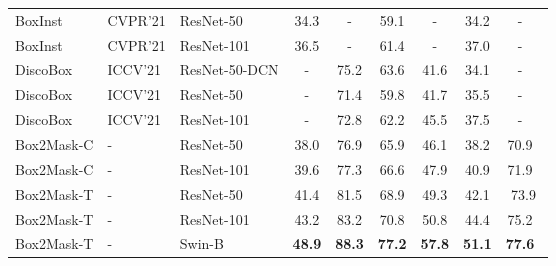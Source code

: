 \documentclass[12pt,onecolumn,letterpaper]{article}
\begin{document}
\begin{table*}[t]
{{\begin{tabular}{lllcccccc}
			
			BoxInst~\cite{cvpr2021_boxinst}  &CVPR'21 & ResNet-50 & 34.3 &- & 59.1 & -  & 34.2  & -~\\ 
			BoxInst~\cite{cvpr2021_boxinst}  &CVPR'21 & ResNet-101 & 36.5& - & 61.4 & - & 37.0 & -~ \\ 
			
			DiscoBox~\cite{iccv2021discobox} &ICCV'21  & ResNet-50-DCN &-& 75.2 &63.6 & 41.6& 34.1 &-~\\ 
			DiscoBox~\cite{iccv2021discobox}  &ICCV'21 & ResNet-50 & - & 71.4& 59.8& 41.7& 35.5 &-~\\ 
			DiscoBox~\cite{iccv2021discobox}  &ICCV'21 & ResNet-101 & - & 72.8 &62.2 & 45.5 & 37.5 &-~\\ 
			
			\hline
			\rowcolor{gray!8}
			Box2Mask-C   & - & ResNet-50 & 38.0 & 76.9& 65.9& 46.1 & 38.2  & 70.9~ \\
			\rowcolor{gray!8}
			Box2Mask-C & - & ResNet-101 & 39.6 & 77.3 & 66.6 & 47.9 & 40.9 & 71.9~ \\
			
			\rowcolor{gray!8}
			Box2Mask-T  & - & ResNet-50 & 41.4 & 81.5 & 68.9  & 49.3 & 42.1 & 73.9  \\
			\rowcolor{gray!8}
			Box2Mask-T  & - & ResNet-101 & 43.2 & 83.2 & 70.8 & 50.8 & 44.4 & 75.2~\\
			\rowcolor{gray!8}
			Box2Mask-T  & - & Swin-B & \textbf{48.9} & \textbf{88.3} & \textbf{77.2} & \textbf{57.8} & \textbf{51.1} & \textbf{77.6}~\\
			\bottomrule
	\end{tabular}}}
	\label{tab:vocsota}
\end{table*}
\end{document}
